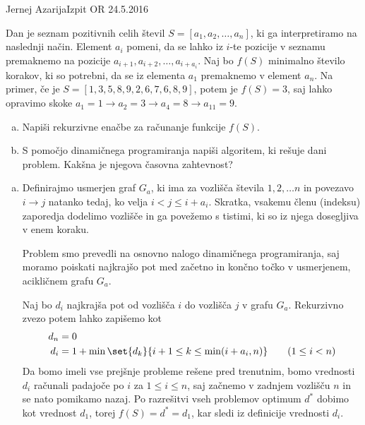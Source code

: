 \begin{naloga}{Jernej Azarija}{Izpit OR 24.5.2016}
\begin{vprasanje}
Dan je seznam pozitivnih celih števil $S = [a_1, a_2, \dots, a_n]$,
ki ga interpretiramo na naslednji način.
Element $a_i$ pomeni,
da se lahko iz $i$-te pozicije v seznamu
premaknemo na pozicije $a_{i+1}, a_{i+2}, \dots, a_{i+a_i}$.
Naj bo $f(S)$ minimalno število korakov,
ki so potrebni, da se iz elementa $a_1$ premaknemo v element $a_n$.
Na primer, če je $S = [1, 3, 5, 8, 9, 2, 6, 7, 6, 8, 9]$,
potem je $f(S) = 3$,
saj lahko opravimo skoke $a_1 = 1 \to a_2 = 3 \to a_4 = 8 \to a_{11} = 9$.

\begin{enumerate}[(a)]
\item Napiši rekurzivne enačbe za računanje funkcije $f(S)$.

\item S pomočjo dinamičnega programiranja napiši algoritem,
ki rešuje dani problem.
Kakšna je njegova časovna zahtevnost?
\end{enumerate}
\end{vprasanje}
\begin{odgovor}

\begin{enumerate}[(a)]

\item Definirajmo usmerjen graf $G_a$,
ki ima za vozlišča števila $1, 2, \dots n$
in povezavo $i \rightarrow j$ natanko tedaj, ko velja $i < j \leq i + a_i$.
Skratka, vsakemu členu (indeksu) zaporedja dodelimo vozlišče
in ga povežemo s tistimi, ki so iz njega dosegljiva v enem koraku.

Problem smo prevedli na osnovno nalogo dinamičnega programiranja, saj moramo poiskati najkrajšo pot med začetno in končno točko v 
usmerjenem, acikličnem grafu $G_a$.

Naj bo $d_i$ najkrajša pot od vozlišča $i$ do vozlišča $j$ v grafu $G_a$. 
Rekurzivno zvezo potem lahko zapišemo kot
\begin{align*}
d_n &= 0 \\
d_i &= 1 + \min\set{d_k}{i+1 \le k \le \min(i+a_i, n)}
\qquad (1 \le i < n)
\end{align*}
Da bomo imeli vse prejšnje probleme rešene pred trenutnim, bomo vrednosti $d_i$ računali padajoče po $i$ za $1 \leq i \leq n$, 
saj začnemo v zadnjem vozlišču $n$ in se nato pomikamo nazaj.
Po razrešitvi vseh problemov optimum $d^*$ dobimo kot vrednost $d_1$,
torej $f(S) = d^* = d_1$, kar sledi iz definicije vrednosti $d_i$.


\end{enumerate}
\end{odgovor}
\end{naloga}
